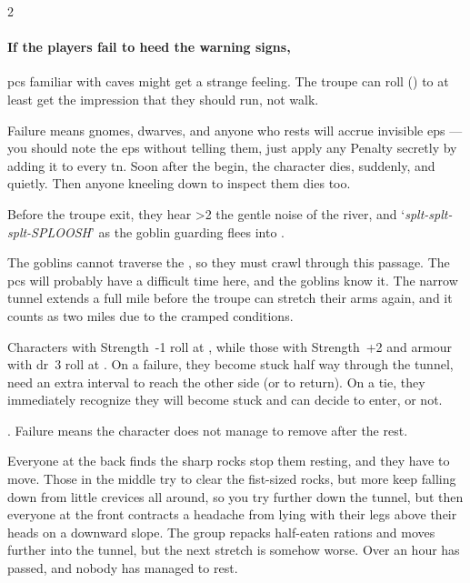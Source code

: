\begin{multicols}{2}
\paragraph{If the players fail to heed the warning signs,}
\glspl{pc} familiar with caves might get a strange feeling.
The troupe can roll  (\tn[13]) to at least get the impression that they should run, not walk.

Failure means gnomes, dwarves, and anyone who rests will accrue invisible \glspl{ep} --- you should note the \glspl{ep} without telling them, just apply any Penalty secretly by adding it to every \gls{tn}.
Soon after the  begin, the character dies, suddenly, and quietly.
Then anyone kneeling down to inspect them dies too.


Before the troupe exit, they hear
\ifnum\thetemperature>2%
  the gentle noise of the river, and
\fi%
`\textit{splt-splt-splt-SPLOOSH}'
as the goblin guarding  flees into .

\playCommentaryPuddle[t]


The goblins cannot traverse the , so they must crawl through this passage.
The \glspl{pc} will probably have a difficult time here, and the goblins know it.
The narrow tunnel extends a full mile before the troupe can stretch their arms again, and it counts as two miles due to the cramped conditions.

Characters with Strength~-1 roll at \tn[4], while those with Strength~+2 and armour with \gls{dr}~3 roll at \tn[10].
On a failure, they become stuck half way through the tunnel, need an extra \gls{interval} to reach the other side (or to return).
On a tie, they immediately recognize they will become stuck and can decide to enter, or not.


.
Failure means the character does not manage to remove  after the rest.

\begin{boxtext}
  Everyone at the back finds the sharp rocks stop them resting, and they have to move.
  Those in the middle try to clear the fist-sized rocks, but more keep falling down from little crevices all around, so you try further down the tunnel, but then everyone at the front contracts a headache from lying with their legs above their heads on a downward slope.
  The group repacks half-eaten \glspl{ration} and moves further into the tunnel, but the next stretch is somehow worse.
  Over an hour has passed, and nobody has managed to rest.
\end{boxtext}


\end{multicols}
